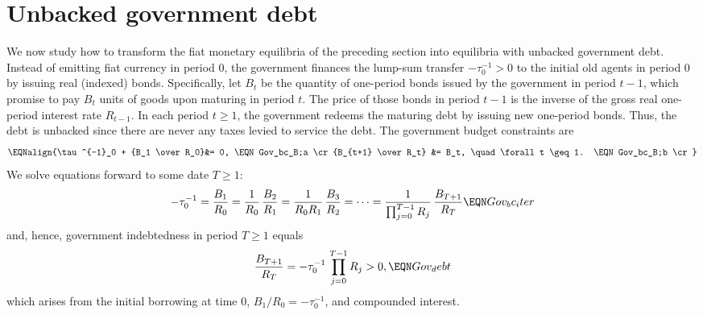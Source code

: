 

 \section{Unbacked government debt}
We now study how to transform  the fiat monetary equilibria of the preceding section 
into equilibria with unbacked government debt. Instead of emitting  
fiat currency in period $0$, the government finances the lump-sum transfer 
$-\tau^{-1}_0 >0$ to the initial old agents in period $0$ by 
issuing real (indexed) bonds. Specifically, let $B_{t}$ be the quantity of 
one-period bonds issued by the government in period $t-1$, 
which promise to pay $B_{t}$ units of goods upon maturing in period $t$. 
The price of those bonds in period $t-1$ is the inverse of the gross 
real one-period interest rate $R_{t-1}$. In each period $t \geq 1$, 
the government redeems the maturing debt by issuing new one-period bonds. 
Thus, the debt is unbacked since there are never any taxes levied to service 
the debt. The government budget constraints are 
$$\EQNalign{\tau^{-1}_0 + {B_1 \over R_0}&= 0,    \EQN Gov_bc_B;a \cr
                     {B_{t+1} \over R_t} &= B_t,  \quad \forall t \geq 1. 
                                                  \EQN Gov_bc_B;b \cr} $$
We solve equations  forward to some date $T\geq 1$:
$$ -\tau^{-1}_0 = {B_1 \over R_0} = {1 \over R_0}\, {B_2 \over R_1}
= {1 \over R_0 R_1} \,{B_3 \over R_2 } = \cdots 
= {1 \over \prod_{j=0}^{T-1} R_j}\, {B_{T+1} \over R_{T} }   \EQN Gov_bc_iter
$$
and, hence, government indebtedness in period $T\geq 1$ equals
$$ {B_{T+1} \over R_{T} } = -\tau^{-1}_0 \, \prod_{j=0}^{T-1} R_j > 0, \EQN Gov_debt
$$
which arises from the initial borrowing at time 0, $B_1/R_0=-\tau^{-1}_0$,
and compounded interest.

